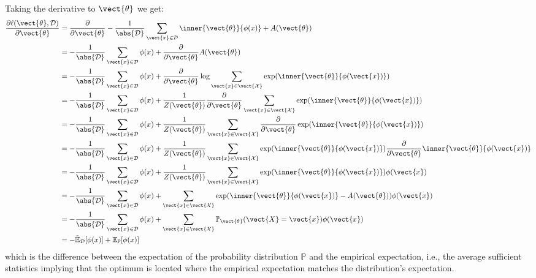     Taking the derivative \wrt to $\vect{\theta}$ we get:
    \begin{equation}
        \label{eq:likelihood_der}
        \begin{split}
            \frac{\partial \ell(\vect{\theta}, \mathcal{D})}{\partial \vect{\theta}} &=  \frac{\partial}{\partial \vect{\theta}}  - \frac{1}{\abs{\mathcal{D}}} \sum_{\vect{x} \in \mathcal{D}} \inner{\vect{\theta}}{\phi(x)} + A(\vect{\theta})\\
            &= - \frac{1}{\abs{\mathcal{D}}}  \sum_{\vect{x} \in \mathcal{D}} \phi(x) +  \frac{\partial}{\partial \vect{\theta}}  A(\vect{\theta}) \\
            &= - \frac{1}{\abs{\mathcal{D}}}  \sum_{\vect{x} \in \mathcal{D}} \phi(x) +  \frac{\partial}{\partial \vect{\theta}}  \log \sum_{\vect{x} \in \vect{\mathcal{X}}} \exp(\inner{\vect{\theta}}{\phi(\vect{x})})\\
            &= - \frac{1}{\abs{\mathcal{D}}}  \sum_{\vect{x} \in \mathcal{D}} \phi(x) +  \frac{1}{Z(\vect{\theta})}\frac{\partial}{\partial \vect{\theta}}  \sum_{\vect{x} \in \vect{\mathcal{X}}} \exp(\inner{\vect{\theta}}{\phi(\vect{x})})\\
            &= - \frac{1}{\abs{\mathcal{D}}}  \sum_{\vect{x} \in \mathcal{D}} \phi(x) +  \frac{1}{Z(\vect{\theta})} \sum_{\vect{x} \in \vect{\mathcal{X}}}  \frac{\partial}{\partial \vect{\theta}}  \exp(\inner{\vect{\theta}}{\phi(\vect{x})})\\
            &= - \frac{1}{\abs{\mathcal{D}}}  \sum_{\vect{x} \in \mathcal{D}} \phi(x) +  \frac{1}{Z(\vect{\theta})} \sum_{\vect{x} \in \vect{\mathcal{X}}} \exp(\inner{\vect{\theta}}{\phi(\vect{x})}) \frac{\partial}{\partial \vect{\theta}}  \inner{\vect{\theta}}{\phi(\vect{x})}\\
            &= - \frac{1}{\abs{\mathcal{D}}}  \sum_{\vect{x} \in \mathcal{D}} \phi(x) +  \frac{1}{Z(\vect{\theta})} \sum_{\vect{x} \in \vect{\mathcal{X}}} \exp(\inner{\vect{\theta}}{\phi(\vect{x})}) \phi(\vect{x})\\
            &= - \frac{1}{\abs{\mathcal{D}}}  \sum_{\vect{x} \in \mathcal{D}} \phi(x) + \sum_{\vect{x} \in \vect{\mathcal{X}}} \exp(\inner{\vect{\theta}}{\phi(\vect{x})} - A(\vect{\theta})) \phi(\vect{x})\\
            &= - \frac{1}{\abs{\mathcal{D}}}  \sum_{\vect{x} \in \mathcal{D}} \phi(x) + \sum_{\vect{x} \in \vect{\mathcal{X}}} \mathbb{P}_{\vect{\theta}}(\vect{X} = \vect{x}) \phi(\vect{x})\\
            &=  - \tilde{\mathbb{E}}_{\mathcal{D}}[\phi(x)] + \mathbb{E}_{\mathbb{P}}[\phi(x)]
        \end{split}
    \end{equation}
    which is the difference between the expectation of the probability distribution $\mathbb{P}$ and the empirical expectation, i.e., the average sufficient statistics implying that the optimum is located where the empirical expectation matches the distribution's expectation.

